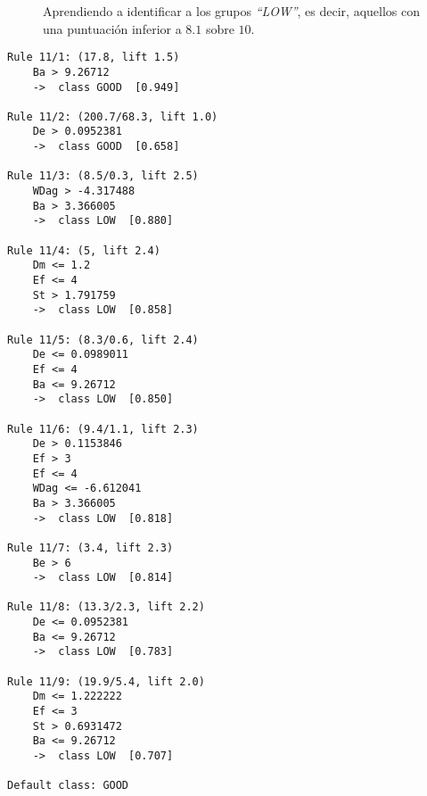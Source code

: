 \begin{figure}[H]
\centering
{}
\caption{Aprendiendo a identificar a los grupos \emph{``LOW''}, es decir, aquellos con una puntuación inferior a $8.1$ sobre $10$.}
\label{fig:cm2}
\end{figure}

\begin{tcolorbox}[title=Reglas de clasificación para identificar grupos de tipo \emph{``LOW''}.]
  \makeatletter
  \makeatother
  
 \label{rules2}  

\begin{multicols}{2}
    \begin{verbatim}
Rule 11/1: (17.8, lift 1.5)
	Ba > 9.26712
	->  class GOOD  [0.949]

Rule 11/2: (200.7/68.3, lift 1.0)
	De > 0.0952381
	->  class GOOD  [0.658]

Rule 11/3: (8.5/0.3, lift 2.5)
	WDag > -4.317488
	Ba > 3.366005
	->  class LOW  [0.880]

Rule 11/4: (5, lift 2.4)
	Dm <= 1.2
	Ef <= 4
	St > 1.791759
	->  class LOW  [0.858]

Rule 11/5: (8.3/0.6, lift 2.4)
	De <= 0.0989011
	Ef <= 4
	Ba <= 9.26712
	->  class LOW  [0.850]

Rule 11/6: (9.4/1.1, lift 2.3)
	De > 0.1153846
	Ef > 3
	Ef <= 4
	WDag <= -6.612041
	Ba > 3.366005
	->  class LOW  [0.818]

Rule 11/7: (3.4, lift 2.3)
	Be > 6
	->  class LOW  [0.814]

Rule 11/8: (13.3/2.3, lift 2.2)
	De <= 0.0952381
	Ba <= 9.26712
	->  class LOW  [0.783]

Rule 11/9: (19.9/5.4, lift 2.0)
	Dm <= 1.222222
	Ef <= 3
	St > 0.6931472
	Ba <= 9.26712
	->  class LOW  [0.707]

Default class: GOOD
    \end{verbatim}
  \end{multicols}
\end{tcolorbox}

